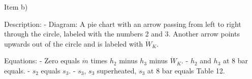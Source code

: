 Item b)

Description:
- Diagram: A pie chart with an arrow passing from left to right through the circle, labeled with the numbers 2 and 3. Another arrow points upwards out of the circle and is labeled with \( \dot{W}_K \).

Equations:
- Zero equals \( \dot{m} \) times \( h_2 \) minus \( h_3 \) minus \( \dot{W}_K \).
- \( h_2 \) and \( h_3 \) at 8 bar equals.
- \( s_2 \) equals \( s_3 \).
- \( s_3 \), \( s_3 \) superheated, \( s_3 \) at 8 bar equals Table 12.